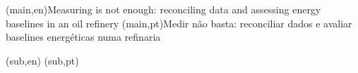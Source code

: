 
%




%
%
%
%
\nttitle(main,en){Measuring is not enough: reconciling data and assessing energy baselines in an oil refinery}%
\nttitle(main,pt){Medir não basta: reconciliar dados e avaliar baselines energéticas numa refinaria}%

\nttitle(sub,en){}%
\nttitle(sub,pt){}%
%
%
%
%



